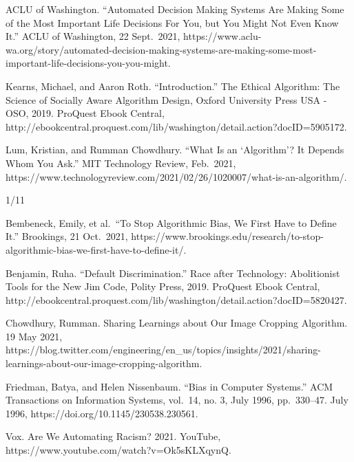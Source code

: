 \documentclass[
]{article}
\newlength{\cslhangindent}
\newlength{\cslentryspacingunit} %
\newenvironment{CSLReferences}[2] %
 {%
  \setlength{\parindent}{0pt}
  \ifodd #1
  \let\oldpar\par
  \def\par{\hangindent=\cslhangindent\oldpar}
  \fi
  \setlength{\parskip}{#2\cslentryspacingunit}
 }%
 {}
\begin{document}
\begin{CSLReferences}{0}{0}
ACLU of Washington. ``Automated Decision Making Systems Are Making Some
of the Most Important Life Decisions For You, but You Might Not Even
Know It.'' ACLU of Washington, 22 Sept.~2021,
https://www.aclu-wa.org/story/automated-decision-making-systems-are-making-some-most-important-life-decisions-you-you-might.

{}

Kearns, Michael, and Aaron Roth. ``Introduction.'' The Ethical
Algorithm: The Science of Socially Aware Algorithm Design, Oxford
University Press USA - OSO, 2019. ProQuest Ebook Central,
http://ebookcentral.proquest.com/lib/washington/detail.action?docID=5905172.

{}

Lum, Kristian, and Rumman Chowdhury. ``What Is an `Algorithm'? It
Depends Whom You Ask.'' MIT Technology Review, Feb.~2021,
https://www.technologyreview.com/2021/02/26/1020007/what-is-an-algorithm/.

{}

\end{CSLReferences}

1/11

\begin{CSLReferences}{0}{0}
Bembeneck, Emily, et al.~``To Stop Algorithmic Bias, We First Have to
Define It.'' Brookings, 21 Oct.~2021,
https://www.brookings.edu/research/to-stop-algorithmic-bias-we-first-have-to-define-it/.

{}

Benjamin, Ruha. ``Default Discrimination.'' Race after Technology:
Abolitionist Tools for the New Jim Code, Polity Press, 2019. ProQuest
Ebook Central,
http://ebookcentral.proquest.com/lib/washington/detail.action?docID=5820427.

{}

Chowdhury, Rumman. Sharing Learnings about Our Image Cropping Algorithm.
19 May 2021,
https://blog.twitter.com/engineering/en\_us/topics/insights/2021/sharing-learnings-about-our-image-cropping-algorithm.

{}

Friedman, Batya, and Helen Nissenbaum. ``Bias in Computer Systems.'' ACM
Transactions on Information Systems, vol.~14, no. 3, July 1996,
pp.~330--47. July 1996, https://doi.org/10.1145/230538.230561.

{}

Vox. Are We Automating Racism? 2021. YouTube,
https://www.youtube.com/watch?v=Ok5sKLXqynQ.

{}

\end{CSLReferences}
\end{document}

